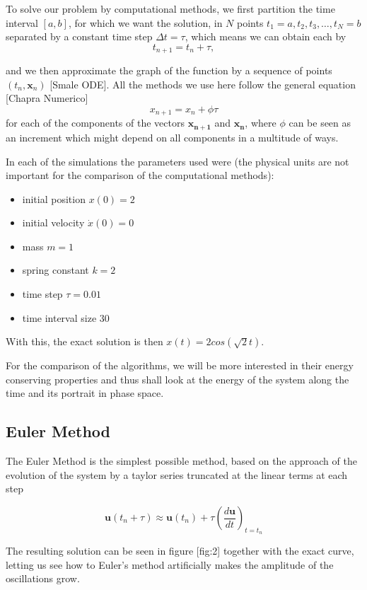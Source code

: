 To solve our problem by computational methods, we first partition the time interval $[a,b]$, for which we want the solution, in $N$ points $t_1=a, t_2, t_3, \dots, t_N = b$ separated by a constant time step $\Delta t = \tau$, which means we can obtain each by
$$t_{n+1} = t_n + \tau,$$

and we then approximate the graph of the function by a sequence of points $(t_n,\mathbf{x}_n)$ [Smale ODE]. All the methods we use here follow the general equation [Chapra Numerico]
$$x_{n+1} = x_n + \phi \tau$$
for each of the components of the vectors $\mathbf{x_{n+1}}$ and $\mathbf{x_n}$, where $\phi$ can be seen as an increment which might depend on all components in a multitude of ways.

In each of the simulations the parameters used were (the physical units are not important for the comparison of the computational methods):

\begin{itemize}
	\item initial position $x(0)=2$
	\item initial velocity $\Dot{x}(0)=0$
	\item mass $m=1$
	\item spring constant $k=2$
	\item time step $\tau = 0.01$
	\item time interval size $30$
\end{itemize}

With this, the exact solution is then $x(t)=2cos(\sqrt{2}t)$.

For the comparison of the algorithms, we will be more interested in their energy conserving properties and thus shall look at the energy of the system along the time and its portrait in phase space.

\subsection{Euler Method}
The Euler Method is the simplest possible method, based on the approach of the evolution of the system by a taylor series truncated at the linear terms at each step

$$\mathbf{u}(t_n+\tau) \approx \mathbf{u}(t_n) + \tau\left( \frac{d\mathbf{u}}{dt}\right)_{t=t_n}$$

The resulting solution can be seen in figure [fig:2] together with the exact curve, letting us see how to Euler's method artificially makes the amplitude of the oscillations grow. 

